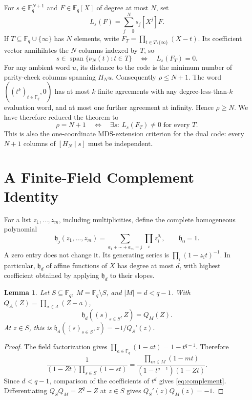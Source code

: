 \documentclass[12pt,letterpaper,onecolumn]{article}
\newtheorem{lemma}[theorem]{Lemma}
\theoremstyle{definition}
\newcommand{\F}{\mathbb F}
\newcommand{\Span}{\operatorname{span}}
\newcommand{\HH}{\mathfrak h}
\begin{document}
For $s\in\F_q^{N+1}$ and $F\in\F_q[X]$ of degree at most $N$, set
\begin{equation}
 L_s(F)=\sum_{j=0}^N s_j[X^j]F.
 \label{eq:functional}
\end{equation}
If $T\subseteq\F_q\cup\{\infty\}$ has $N$ elements, write $F_T=\prod_{t\in T\setminus\{\infty\}}(X-t)$. Its coefficient vector annihilates the $N$ columns indexed by $T$, so
\begin{equation}
 s\in\Span\{\nu_N(t):t\in T\}\quad\Longleftrightarrow\quad L_s(F_T)=0.
 \label{eq:span}
\end{equation}
For any ambient word $u$, its distance to the code is the minimum number of parity-check columns spanning $H_Nu$. Consequently $\rho\le N+1$. The word $((t^k)_{t\in\F_q},0)$ has at most $k$ finite agreements with any degree-less-than-$k$ evaluation word, and at most one further agreement at infinity. Hence $\rho\ge N$. We have therefore reduced the theorem to
\begin{equation}
 \rho=N+1\quad\Longleftrightarrow\quad
 \exists s:\ L_s(F_T)\ne0\text{ for every }T.
 \label{eq:extension}
\end{equation}
This is also the one-coordinate MDS-extension criterion for the dual code: every $N+1$ columns of $[H_N\mid s]$ must be independent.

\section{A Finite-Field Complement Identity}
For a list $z_1,\ldots,z_m$, including multiplicities, define the complete homogeneous polynomial
\begin{equation}
 \HH_j(z_1,\ldots,z_m)=\sum_{a_1+\cdots+a_m=j}\prod_i z_i^{a_i},
 \qquad \HH_0=1.
 \label{eq:h}
\end{equation}
A zero entry does not change it. Its generating series is $\prod_i(1-z_it)^{-1}$. In particular, $\HH_d$ of affine functions of $X$ has degree at most $d$, with highest coefficient obtained by applying $\HH_d$ to their slopes.

\begin{lemma}\label{lem:complement}
Let $S\subseteq\F_q$, $M=\F_q\setminus S$, and $|M|=d<q-1$. With $Q_A(Z)=\prod_{a\in A}(Z-a)$,
\begin{equation}
 \HH_d((s)_{s\in S},Z)=Q_M(Z).
 \label{eq:complement}
\end{equation}
At $z\in S$, this is $\HH_d((s)_{s\in S},z)=-1/Q_S'(z)$.
\end{lemma}
\begin{proof}
The field factorization gives $\prod_{a\in\F_q}(1-at)=1-t^{q-1}$. Therefore
\[
 \frac1{(1-Zt)\prod_{s\in S}(1-st)}
 =\frac{\prod_{m\in M}(1-mt)}{(1-t^{q-1})(1-Zt)}.
\]
Since $d<q-1$, comparison of the coefficients of $t^d$ gives \eqref{eq:complement}. Differentiating $Q_SQ_M=Z^q-Z$ at $z\in S$ gives $Q_S'(z)Q_M(z)=-1$.
\end{proof}
\end{document}
